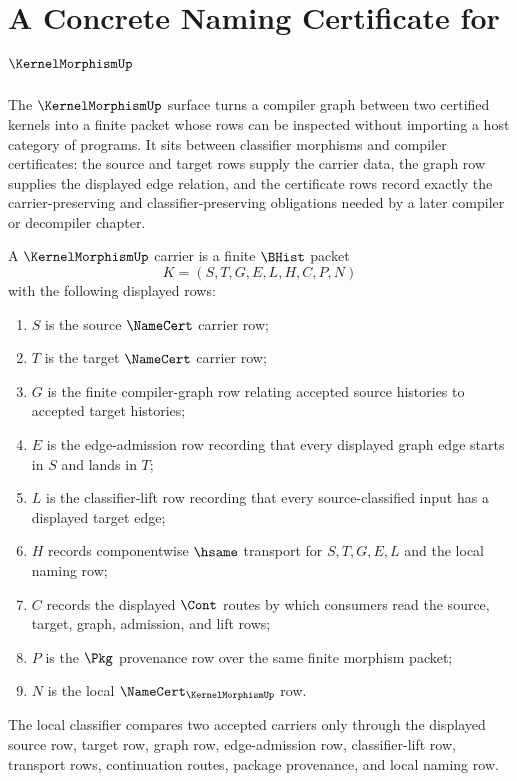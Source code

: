\chapter{A Concrete Naming Certificate for $\KernelMorphismUp$}
\label{ch:concrete-instances-kernelmorphism-namecert}

The $\KernelMorphismUp$ surface turns a compiler graph between two certified kernels into a finite packet whose rows can be inspected without importing a host category of programs. It sits between classifier morphisms and compiler certificates: the source and target rows supply the carrier data, the graph row supplies the displayed edge relation, and the certificate rows record exactly the carrier-preserving and classifier-preserving obligations needed by a later compiler or decompiler chapter.

\begin{definition}
\label{def:kernel-morphism-carrier}
A $\KernelMorphismUp$ carrier is a finite $\BHist$ packet
$$
K=(S,T,G,E,L,H,C,P,N)
$$
with the following displayed rows:
\begin{enumerate}
\item $S$ is the source $\NameCert$ carrier row;
\item $T$ is the target $\NameCert$ carrier row;
\item $G$ is the finite compiler-graph row relating accepted source histories to accepted target histories;
\item $E$ is the edge-admission row recording that every displayed graph edge starts in $S$ and lands in $T$;
\item $L$ is the classifier-lift row recording that every source-classified input has a displayed target edge;
\item $H$ records componentwise $\hsame$ transport for $S,T,G,E,L$ and the local naming row;
\item $C$ records the displayed $\Cont$ routes by which consumers read the source, target, graph, admission, and lift rows;
\item $P$ is the $\Pkg$ provenance row over the same finite morphism packet;
\item $N$ is the local $\NameCert_{\KernelMorphismUp}$ row.
\end{enumerate}
The local classifier compares two accepted carriers only through the displayed source row, target row, graph row, edge-admission row, classifier-lift row, transport rows, continuation routes, package provenance, and local naming row.
\end{definition}

